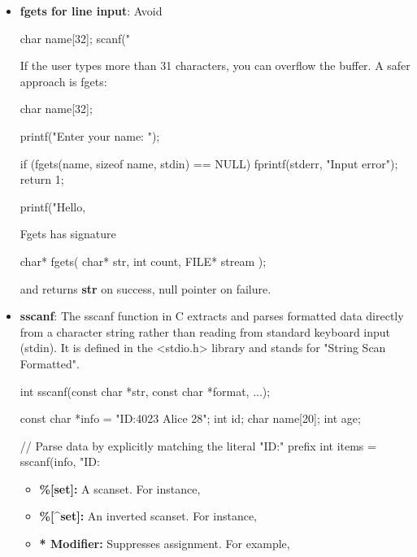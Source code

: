 \documentclass{report}
\begin{document}
\begin{itemize}
            \bigbreak \noindent 
            \begin{cppcode}
            putchar('A');
            \end{cppcode}
        \item \textbf{fgets for line input}:  Avoid
            \bigbreak \noindent 
            \begin{cppcode}
                char name[32];
                scanf("%
            \end{cppcode}
            \bigbreak \noindent 
            If the user types more than 31 characters, you can overflow the buffer. A safer approach is fgets:
            \bigbreak \noindent 
            \begin{cppcode}
                char name[32];

                printf("Enter your name: ");

                if (fgets(name, sizeof name, stdin) == NULL) {
                    fprintf(stderr, "Input error\n");
                    return 1;
                }

                printf("Hello, %
            \end{cppcode}
            \bigbreak \noindent 
            Fgets has signature
            \bigbreak \noindent 
            \begin{cppcode}
            char* fgets( char* str, int count, FILE* stream );
            \end{cppcode}
            \bigbreak \noindent 
            and returns \textbf{str} on success, null pointer on failure.
        \item \textbf{sscanf}: The sscanf function in C extracts and parses formatted data directly from a character string rather than reading from standard keyboard input (stdin). It is defined in the <stdio.h> library and stands for "String Scan Formatted". 
            \bigbreak \noindent 
            \begin{cppcode}
            int sscanf(const char *str, const char *format, ...);
            \end{cppcode}
            \bigbreak \noindent 
            \begin{cppcode}
                const char *info = "ID:4023 Alice 28";
                int id;
                char name[20];
                int age;

                // Parse data by explicitly matching the literal "ID:" prefix
                int items = sscanf(info, "ID:%
            \end{cppcode}
            \begin{itemize}
                \item \textbf{\%[set]:} A scanset. For instance, %
                \item \textbf{\%[^set]:} An inverted scanset. For instance, %
                \item \textbf{* Modifier:} Suppresses assignment. For example, %
            \end{itemize}



\end{itemize}
\end{document}

